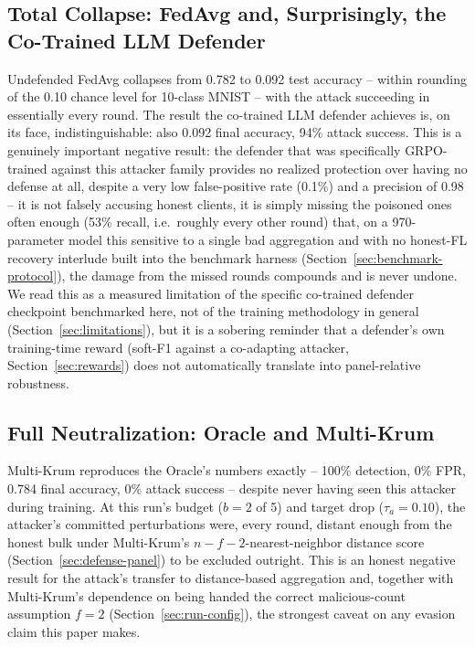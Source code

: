 \documentclass[conference]{IEEEtran}
\begin{document}
\subsection{Total Collapse: FedAvg and, Surprisingly, the Co-Trained LLM Defender}
Undefended FedAvg collapses from 0.782 to 0.092 test accuracy -- within rounding of the 0.10 chance level for 10-class MNIST -- with the attack succeeding in essentially every round. The result the co-trained LLM defender achieves is, on its face, indistinguishable: also 0.092 final accuracy, 94\% attack success. This is a genuinely important negative result: the defender that was specifically GRPO-trained against this attacker family provides no realized protection over having no defense at all, despite a very low false-positive rate (0.1\%) and a precision of 0.98 -- it is not falsely accusing honest clients, it is simply missing the poisoned ones often enough (53\% recall, i.e.\ roughly every other round) that, on a 970-parameter model this sensitive to a single bad aggregation and with no honest-FL recovery interlude built into the benchmark harness (Section~\ref{sec:benchmark-protocol}), the damage from the missed rounds compounds and is never undone. We read this as a measured limitation of the specific co-trained defender checkpoint benchmarked here, not of the training methodology in general (Section~\ref{sec:limitations}), but it is a sobering reminder that a defender's own training-time reward (soft-F1 against a co-adapting attacker, Section~\ref{sec:rewards}) does not automatically translate into panel-relative robustness.

\subsection{Full Neutralization: Oracle and Multi-Krum}
Multi-Krum reproduces the Oracle's numbers exactly -- 100\% detection, 0\% FPR, 0.784 final accuracy, 0\% attack success -- despite never having seen this attacker during training. At this run's budget ($b=2$ of 5) and target drop ($\tau_a=0.10$), the attacker's committed perturbations were, every round, distant enough from the honest bulk under Multi-Krum's $n-f-2$-nearest-neighbor distance score (Section~\ref{sec:defense-panel}) to be excluded outright. This is an honest negative result for the attack's transfer to distance-based aggregation and, together with Multi-Krum's dependence on being handed the correct malicious-count assumption $f=2$ (Section~\ref{sec:run-config}), the strongest caveat on any evasion claim this paper makes.
\end{document}
